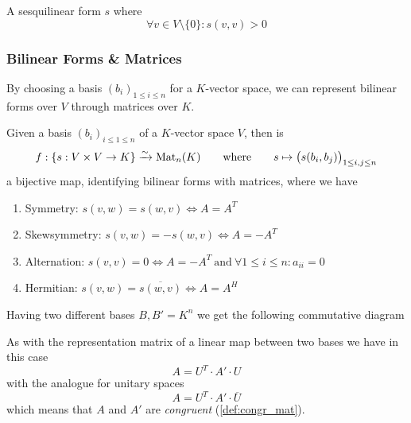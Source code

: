 \begin{definition}
   A sesquilinear form \(s\) where
   \[\forall v \in V\setminus\{0\}: s(v, v) > 0\]
\end{definition}

\subsubsection{Bilinear Forms \& Matrices}
By choosing a basis \((b_i)_{1 \leq i \leq n}\) for a \(K\)-vector space, we can represent bilinear forms over \(V\) through matrices over \(K\).

\begin{proposition}
   Given a basis \((b_i)_{i \leq 1 \leq n}\) of a \(K\)-vector space \(V\), then is
   \[f: \{s: V \times V \to K\} \xrightarrow{\sim} \operatorname{Mat}_n(K) \qquad\text{where}\qquad s \mapsto \big(s(b_i, b_j)\big)_{1 \leq i,j \leq n}\]
   a bijective map, identifying bilinear forms with matrices, where we have
   \begin{enumerate}[label=\roman*, align=Center]
      \item Symmetry: \(s(v, w) = s(w, v) \iff A = A^T\)
      \item Skewsymmetry: \(s(v, w) = -s(w, v) \iff A = -A^T\)
      \item Alternation: \(s(v, v) = 0 \iff A = -A^T~\text{and}~\forall 1 \leq i \leq n: a_{ii} = 0\)
      \item Hermitian: \(s(v, w) = \overline{s(w, v)} \iff A = A^H\)
   \end{enumerate}
\end{proposition}

Having two different bases \(B, B' = K^n\) we get the following commutative diagram
\begin{center}
\end{center}
As with the representation matrix of a linear map between two bases we have in this case
\[A = U^T \cdot A' \cdot U\]
with the analogue for unitary spaces
\[A = U^T \cdot A' \cdot \overline{U}\]
which means that \(A\) and \(A'\) are \emph{congruent} (\ref{def:congr_mat}).

